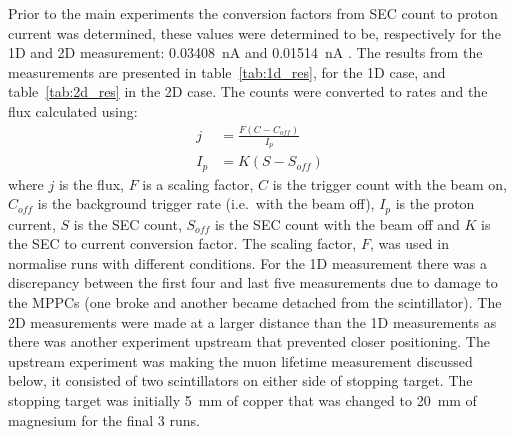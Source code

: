 Prior to the main experiments the conversion factors from SEC count to proton current was determined, these values were determined to be, respectively for the 1D and 2D measurement: 0.03408~nA and 0.01514~nA . The results from the measurements are presented in table~\ref{tab:1d_res}, for the 1D case, and table~\ref{tab:2d_res} in the 2D case. The counts were converted to rates and the flux calculated using:
\begin{align}
  j &= \frac{F(C - C_{off})}{I_{p}} \\
  I_{p} &= K(S - S_{off})
\end{align}
where \(j\) is the flux, \(F\) is a scaling factor, \(C\) is the trigger count with the beam on, \(C_{off}\) is the background trigger rate (i.e.\ with the beam off), \( I_{p} \) is the proton current, \(S\) is the SEC count, \(S_{off}\) is the SEC count with the beam off and \(K\) is the SEC to current conversion factor. The scaling factor, \(F\), was  used in normalise runs with different conditions. For the 1D measurement there was a discrepancy between the first four and last five measurements due to damage to the MPPCs (one broke and another became detached from the scintillator). The 2D measurements were made at a larger distance than the 1D measurements as there was another experiment upstream that prevented closer positioning. The upstream experiment was making the muon lifetime measurement discussed below, it consisted of two scintillators on either side of stopping target. The stopping target was initially 5~mm of copper  that was changed to 20~mm of magnesium for the final 3 runs.

